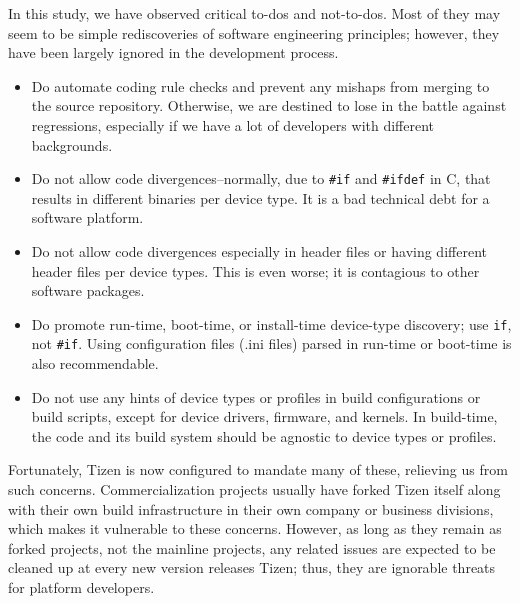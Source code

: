 In this study, we have observed critical to-dos and not-to-dos. Most of they may seem to be simple rediscoveries of software engineering principles; however, they have been largely ignored in the development process.

\begin{itemize}
\item	Do automate coding rule checks and prevent any mishaps from merging to the source repository. Otherwise, we are destined to lose in the battle against regressions, especially if we have a lot of developers with different backgrounds.
\item	Do not allow code divergences--normally, due to \texttt{\#if} and \texttt{\#ifdef} in C, that results in different binaries per device type. It is a bad technical debt for a software platform.
\item	Do not allow code divergences especially in header files or having different header files per device types. This is even worse; it is contagious to other software packages.
\item	Do promote run-time, boot-time, or install-time device-type discovery; use \texttt{if}, not \texttt{\#if}. Using configuration files (.ini files) parsed in run-time or boot-time is also recommendable.
\item	Do not use any hints of device types or profiles in build configurations or build scripts, except for device drivers, firmware, and kernels. In build-time, the code and its build system should be agnostic to device types or profiles.
\end{itemize}

Fortunately, Tizen is now configured to mandate many of these, relieving us from such concerns.
Commercialization projects usually have forked Tizen itself along with their own build infrastructure in their own company or business divisions, which makes it vulnerable to these concerns.
However, as long as they remain as forked projects, not the mainline projects, any related issues are expected to be cleaned up at every new version releases Tizen; thus, they are ignorable threats for platform developers.

